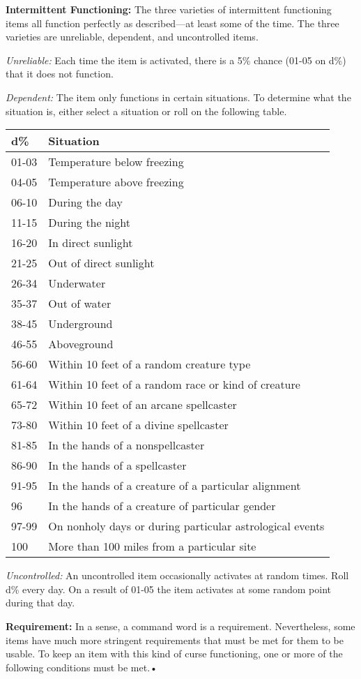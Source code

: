 \documentclass{article}
\begin{document}
\textbf{Intermittent Functioning:} The three varieties of intermittent functioning 
items all function perfectly as described---at least some of the time. The three 
varieties are unreliable, dependent, and uncontrolled items.

\textit{Unreliable: }Each time the item is activated, there is a 5\% chance (01-05 
on d\%) that it does not function.

\textit{Dependent: }The item only functions in certain situations. To determine 
what the situation is, either select a situation or roll on the following table.

\begin{tabular}{|>{\raggedright}p{28pt}|>{\raggedright}p{229pt}|}
\hline
d\textbf{\%} & S\textbf{ituation}\tabularnewline
\hline
01-03 & Temperature below freezing\tabularnewline
\hline
04-05 & Temperature above freezing\tabularnewline
\hline
06-10 & During the day\tabularnewline
\hline
11-15 & During the night\tabularnewline
\hline
16-20 & In direct sunlight\tabularnewline
\hline
21-25 & Out of direct sunlight\tabularnewline
\hline
26-34 & Underwater\tabularnewline
\hline
35-37 & Out of water\tabularnewline
\hline
38-45 & Underground\tabularnewline
\hline
46-55 & Aboveground\tabularnewline
\hline
56-60 & Within 10 feet of a random creature type\tabularnewline
\hline
61-64 & Within 10 feet of a random race or kind of creature\tabularnewline
\hline
65-72 & Within 10 feet of an arcane spellcaster\tabularnewline
\hline
73-80 & Within 10 feet of a divine spellcaster\tabularnewline
\hline
81-85 & In the hands of a nonspellcaster\tabularnewline
\hline
86-90 & In the hands of a spellcaster\tabularnewline
\hline
91-95 & In the hands of a creature of a particular alignment\tabularnewline
\hline
96 & In the hands of a creature of particular gender\tabularnewline
\hline
97-99 & On nonholy days or during particular astrological events\tabularnewline
\hline
100 & More than 100 miles from a particular site\tabularnewline
\hline
\end{tabular}

\textit{Uncontrolled: }An uncontrolled item occasionally activates at random times. 
Roll d\% every day. On a result of 01-05 the item activates at some random point 
during that day. 

\textbf{Requirement:} In a sense, a command word is a requirement. Nevertheless, 
some items have much more stringent requirements that must be met for them to be 
usable. To keep an item with this kind of curse functioning, one or more of the 
following conditions must be met.• 
\end{document}
